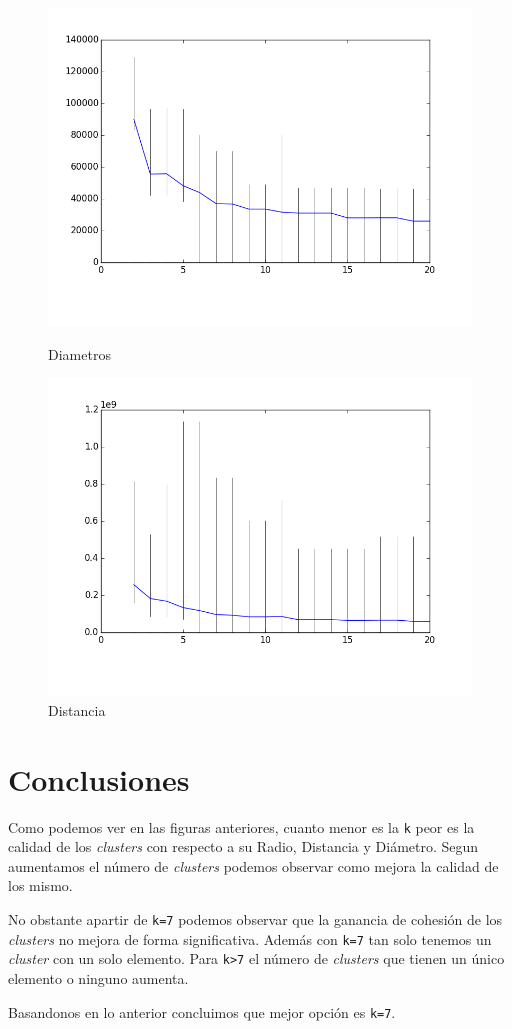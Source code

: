 \documentclass{article}
\begin{document}
    \begin{figure}
      \centering
      \includegraphics[keepaspectratio, width=1\textwidth]{../k-means/Diametros.png}
      \caption{Diametros}
      \label{fig:diam}
      \includegraphics[keepaspectratio, width=1\textwidth]{../k-means/Distancia.png}
      \caption{Distancia}
      \label{fig:dist}
    \end{figure}

  \section{Conclusiones}
    Como podemos ver en las figuras anteriores, cuanto menor es la \texttt{k} 
    peor es la calidad de los \emph{clusters} con respecto a su Radio, Distancia y 
    Diámetro. Segun aumentamos el número de \emph{clusters} podemos observar como
    mejora la calidad de los mismo.
    \par
    No obstante apartir de \texttt{k=7} podemos observar que la ganancia de cohesión
    de los \emph{clusters} no mejora de forma significativa. Además con \texttt{k=7}
    tan solo tenemos un \emph{cluster} con un solo elemento. Para \texttt{k>7} el
    número de \emph{clusters} que tienen un único elemento o ninguno aumenta.  
    \par
    Basandonos en lo anterior concluimos que mejor opción es \texttt{k=7}.  
    
\end{document}
